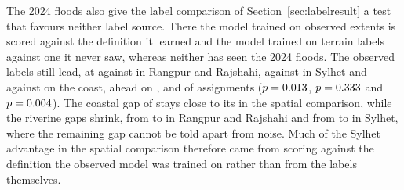 The 2024 floods also give the label comparison of Section~\ref{sec:labelresult} a test that favours neither label source. There the model trained on observed extents is scored against the definition it learned and the model trained on terrain labels against one it never saw, whereas neither has seen the 2024 floods. The observed labels still lead, at \RRTempAUC{} against \RRTempProxyAUC{} in Rangpur and Rajshahi, \SylhetTempAUC{} against \SylhetTempProxyAUC{} in Sylhet and \CoastalTempAUC{} against \CoastalTempProxyAUC{} on the coast, ahead on \RRTempProxyAhead{}, \SylhetTempProxyAhead{} and \CoastalTempProxyAhead{} of \RRTempSeeds{} assignments ($p=0.013{}$, $p=0.333{}$ and $p=0.004{}$). The coastal gap of \CoastalTempProxyGap{} stays close to its \CoastalLabelGap{} in the spatial comparison, while the riverine gaps shrink, from \RRLabelGap{} to \RRTempProxyGap{} in Rangpur and Rajshahi and from \SylhetLabelGap{} to \SylhetTempProxyGap{} in Sylhet, where the remaining gap cannot be told apart from noise. Much of the Sylhet advantage in the spatial comparison therefore came from scoring against the definition the observed model was trained on rather than from the labels themselves.
